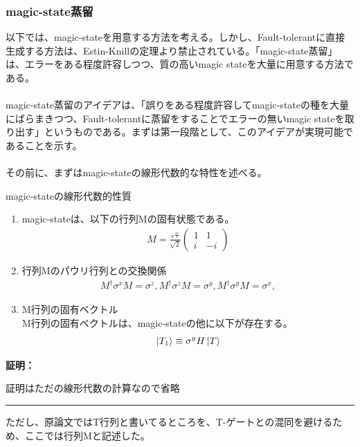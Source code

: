 \documentclass[a4paper,10.5pt]{article}
\numberwithin{equation}{section}
\newenvironment{proofbox}
{\begin{prooflabel}\textbf{証明：}\end{prooflabel}\vspace{0.8em}}
{\par\vspace{1em}\hrule\vspace{1em}}
\begin{document}
\subsubsection{magic-state蒸留}
以下では、magic-stateを用意する方法を考える。しかし、Fault-tolerantに直接生成する方法は、Estin-Knillの定理より禁止されている。「magic-state蒸留」は、エラーをある程度許容しつつ、質の高いmagic stateを大量に用意する方法である。\\
\\
magic-state蒸留のアイデアは、「誤りをある程度許容してmagic-stateの種を大量にばらまきつつ、Fault-tolerantに蒸留をすることでエラーの無いmagic stateを取り出す」というものである。まずは第一段階として、このアイデアが実現可能であることを示す。\\
\\
その前に、まずはmagic-stateの線形代数的な特性を述べる。
\begin{resultbox}{magic-stateの線形代数的性質}
    \begin{enumerate}
        \item magic-stateは、以下の行列Mの固有状態である。
        \begin{align*}
            M=\frac{e^{\frac{i\pi}{4}}}{\sqrt{2}}\begin{pmatrix}
         1 & 1 \\i& -i 
        \end{pmatrix}
        \end{align*}
        \item 行列Mのパウリ行列との交換関係
        \begin{align*}
        M^{\dagger}\sigma^{x}M=\sigma^{z},M^{\dagger}\sigma^{z}M=\sigma^{y},M^{\dagger}\sigma^{y}M=\sigma^{x},
        \end{align*}
        \item M行列の固有ベクトル\\
        M行列の固有ベクトルは、magic-stateの他に以下が存在する。
        \begin{align*}
            \ket{T_{1}}\equiv \sigma^{y}H\ket{T}
        \end{align*}
    \end{enumerate}
\end{resultbox}
\begin{proofbox}
    証明はただの線形代数の計算なので省略
\end{proofbox}
ただし、原論文ではT行列と書いてるところを、T-ゲートとの混同を避けるため、ここでは行列Mと記述した。\\
\\
\end{document}
